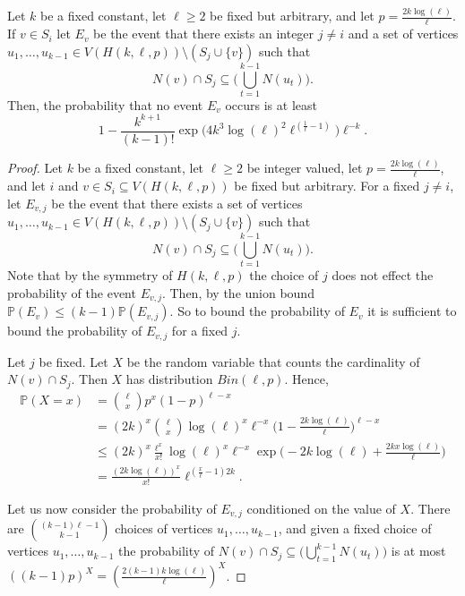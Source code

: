\documentclass[10pt,a4paper]{amsart}
\begin{document}
\begin{lemma}\label{Lemma: Always an escape in H}
    Let $k$ be a fixed constant, let $\ell\geq 2$ be fixed but arbitrary, and let $p = \frac{2k\log(\ell)}{\ell}$.
    If $v\in S_i$
    let $E_v$ be the event that there exists an integer $j\neq i$ and a set of vertices $u_1,\dots, u_{k-1} \in V(H(k,\ell,p))\setminus (S_j \cup \{v\})$
    such that 
    \[
    N(v) \cap S_j \subseteq \Big(\bigcup_{t=1}^{k-1} N(u_t) \Big).
    \]
    Then, the probability that no event $E_v$ occurs is at least 
    \[
    1 - \frac{k^{k+1}}{(k-1)!}\exp\Big(4 k^{3} \log(\ell)^2 \ell^{(\frac{1}{\ell}-1)}\Big)\ell^{-k}.
    \]
\end{lemma}

\begin{proof}
    Let $k$ be a fixed constant, let $\ell\geq 2$ be integer valued, let $p = \frac{2k\log(\ell)}{\ell}$,
    and 
    let $i$ and $v \in S_i \subseteq V(H(k,\ell,p))$ be fixed but arbitrary.
    For a fixed $j\neq i$, let $E_{v,j}$ be the event
    that there exists a set of vertices $u_1,\dots, u_{k-1} \in V(H(k,\ell,p))\setminus (S_j \cup \{v\})$
    such that 
    \[
    N(v) \cap S_j \subseteq \Big(\bigcup_{t=1}^{k-1} N(u_t) \Big).
    \]
    Note that by the symmetry of $H(k,\ell,p)$ the choice of $j$ does not effect the probability of the event $E_{v,j}$.
    Then, by the union bound $\mathbb{P}(E_v) \leq (k-1)\mathbb{P}(E_{v,j})$.
    So to bound the probability of $E_v$ it is sufficient to bound the probability of $E_{v,j}$ for a fixed $j$.

    Let $j$ be fixed.
    Let $X$ be the random variable that counts the cardinality of $N(v) \cap S_j$.
    Then $X$ has distribution $Bin(\ell,p)$.
    Hence,
    \begin{align*}
        \mathbb{P}(X = x) & = \binom{\ell}{x}p^x(1-p)^{\ell-x} \\
        & = (2k)^x\binom{\ell}{x}\log(\ell)^x \ell^{-x}\Big(1-\frac{2k\log(\ell)}{\ell} \Big)^{\ell-x} \\
        & \leq (2k)^x\frac{\ell^x}{x!}\log(\ell)^x \ell^{-x} \exp\Big(-2k\log(\ell) + \frac{2kx\log(\ell)}{\ell}\Big) \\
        & = \frac{(2k\log(\ell))^x}{x!}\ell^{(\frac{x}{\ell}-1)2k}.
    \end{align*}

    Let us now consider the probability of $E_{v,j}$ conditioned on the value of $X$.
    There are $\binom{(k-1)\ell-1}{k-1}$ choices of vertices $u_1,\dots, u_{k-1}$,
    and given a fixed choice of vertices $u_1,\dots, u_{k-1}$ 
    the probability of $N(v) \cap S_j \subseteq \Big(\bigcup_{t=1}^{k-1} N(u_t) \Big)$
    is at most $((k-1)p)^{X} = (\frac{2(k-1)k\log(\ell)}{\ell})^X$.


\end{proof}
\end{document}
